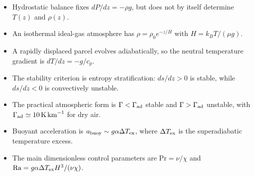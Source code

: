 \begin{itemize}
    \item Hydrostatic balance fixes $dP/dz=-\rho g$, but does not by itself
    determine $T(z)$ and $\rho(z)$.
    \item An isothermal ideal-gas atmosphere has
    $\rho=\rho_0e^{-z/H}$ with $H=k_BT/(\mu g)$.
    \item A rapidly displaced parcel evolves adiabatically, so the neutral
    temperature gradient is $dT/dz=-g/c_p$.
    \item The stability criterion is entropy stratification:
    $ds/dz>0$ is stable, while $ds/dz<0$ is convectively unstable.
    \item The practical atmospheric form is
    $\Gamma<\Gamma_{\rm ad}$ stable and $\Gamma>\Gamma_{\rm ad}$ unstable,
    with $\Gamma_{\rm ad}\simeq10\,\si{K\,km^{-1}}$ for dry air.
    \item Buoyant acceleration is
    $a_{\rm buoy}\sim g\alpha\Delta T_{\rm ex}$, where
    $\Delta T_{\rm ex}$ is the superadiabatic temperature excess.
    \item The main dimensionless control parameters are
    $\mathrm{Pr}=\nu/\chi$ and
    $\mathrm{Ra}=g\alpha\Delta T_{\rm ex}H^3/(\nu\chi)$.
\end{itemize}
